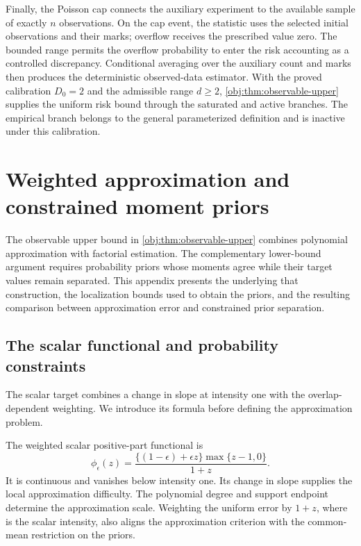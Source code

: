 \documentclass[11pt]{article}
\begin{document}
Finally, the Poisson cap connects the auxiliary experiment to the available sample of exactly \(n\) observations. On the cap event, the statistic uses the selected initial observations and their marks; overflow receives the prescribed value zero. The bounded range permits the overflow probability to enter the risk accounting as a controlled discrepancy. Conditional averaging over the auxiliary count and marks then produces the deterministic observed-data estimator. With the proved calibration \(D_0=2\) and the admissible range \(d\ge2\), \cref{obj:thm:observable-upper} supplies the uniform risk bound through the saturated and active branches. The empirical branch belongs to the general parameterized definition and is inactive under this calibration.


\section{Weighted approximation and constrained moment priors}\label{sec:appendix-weighted}

The observable upper bound in \cref{obj:thm:observable-upper} combines polynomial approximation with factorial estimation. The complementary lower-bound argument requires probability priors whose moments agree while their target values remain separated. This appendix presents the  underlying that construction, the localization bounds used to obtain the priors, and the resulting comparison between approximation error and constrained prior separation.

\subsection{The scalar functional and probability constraints}

The scalar target combines a change in slope at intensity one with the overlap-dependent weighting. We introduce its formula before defining the approximation problem.



The weighted scalar positive-part functional  is
\[
\phi_\epsilon(z)
=\frac{\{(1-\epsilon)+\epsilon z\}\max\{z-1,0\}}{1+z}.
\]
It is continuous and vanishes below intensity one. Its change in slope supplies the local approximation difficulty. The polynomial degree  and support endpoint  determine the approximation scale. Weighting the uniform error by \(1+z\), where  is the scalar intensity, also aligns the approximation criterion with the common-mean restriction on the priors.
\end{document}
